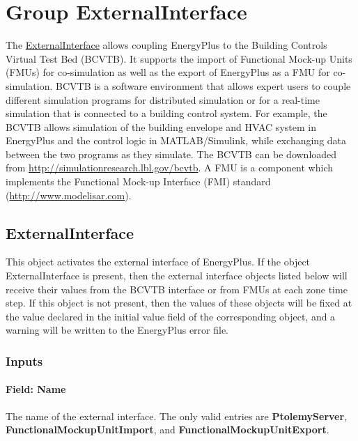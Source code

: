 \section{Group ExternalInterface}\label{group-externalinterface}

The \hyperref[externalinterface]{ExternalInterface} allows coupling EnergyPlus to the Building Controls Virtual Test Bed (BCVTB). It supports the import of Functional Mock-up Units (FMUs) for co-simulation as well as the export of EnergyPlus as a FMU for co-simulation. BCVTB is a software environment that allows expert users to couple different simulation programs for distributed simulation or for a real-time simulation that is connected to a building control system. For example, the BCVTB allows simulation of the building envelope and HVAC system in EnergyPlus and the control logic in MATLAB/Simulink, while exchanging data between the two programs as they simulate. The BCVTB can be downloaded from \url{http://simulationresearch.lbl.gov/bcvtb}. A FMU is a component which implements the Functional Mock-up Interface (FMI) standard (\url{http://www.modelisar.com}).

\subsection{ExternalInterface}\label{externalinterface}

This object activates the external interface of EnergyPlus. If the object ExternalInterface is present, then the external interface objects listed below will receive their values from the BCVTB interface or from FMUs at each zone time step. If this object is not present, then the values of these objects will be fixed at the value declared in the initial value field of the corresponding object, and a warning will be written to the EnergyPlus error file.

\subsubsection{Inputs}\label{inputs-018}

\paragraph{Field: Name}\label{field-name-017}

The name of the external interface. The only valid entries are \textbf{PtolemyServer}, \textbf{FunctionalMockupUnitImport}, and \textbf{FunctionalMockupUnitExport}.

